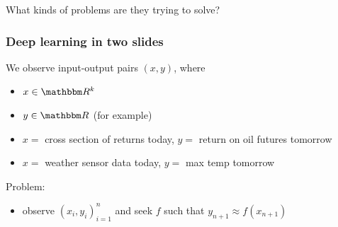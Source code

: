 \begin{frame}
    
    What kinds of problems are they trying to solve?

\end{frame}




\begin{frame}
    \frametitle{Deep learning in two slides}
    
    We observe input-output pairs $(x, y)$, where
    \begin{itemize}
        \item $x \in \RR^k$
        \item $y \in \RR$  (for example)
    \end{itemize}

    \Egs
    \begin{itemize}
        \item $x = $ cross section of returns today, $y = $ return on oil futures tomorrow
        \vspace{0.5em}
        \item $x = $ weather sensor data today, $y = $ max temp tomorrow
    \end{itemize}
        \vspace{0.5em}
        \vspace{0.5em}

    Problem:

    \begin{itemize}
        \item observe $(x_i, y_i)_{i=1}^n$ and seek $f$ such that $y_{n+1}
            \approx f(x_{n+1})$
    \end{itemize}

\end{frame}


